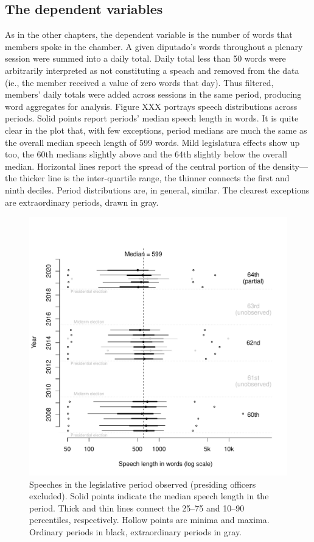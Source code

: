 \documentclass[letter,12pt]{article}
\begin{document}
\subsection{The dependent variables}

As in the other chapters, the dependent variable is the number of words that members spoke in the chamber. A given diputado's words throughout a plenary session were summed into a daily total. Daily total less than 50 words were arbitrarily interpreted as not constituting a speach and removed from the data (ie., the member received a value of zero words that day). Thus filtered, members' daily totals were added across sessions in the same period, producing word aggregates for analysis. Figure XXX portrays speech distributions across periods. Solid points report periods' median speech length in words. It is quite clear in the plot that, with few exceptions, period medians are much the same as the overall median speech length of 599 words. Mild legislatura effects show up too, the 60th medians slightly above and the 64th slightly below the overall median. Horizontal lines report the spread of the central portion of the density---the thicker line is the inter-quartile range, the thinner connects the first and ninth deciles. Period distributions are, in general, similar. The clearest exceptions are extraordinary periods, drawn in gray. 

\begin{figure}
  \centering
    \includegraphics[width=.8\columnwidth]{../plots/quantiles-periodo.pdf}
    \caption{Speeches in the legislative period observed (presiding officers excluded). Solid points indicate the median speech length in the period. Thick and thin lines connect the 25--75 and 10--90 percentiles, respectively. Hollow points are minima and maxima. Ordinary periods in black, extraordinary periods in gray.}\label{F:quantiles}
\end{figure}
\end{document}
